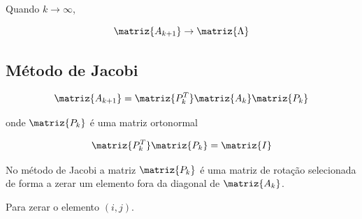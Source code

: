 Quando $ k \rightarrow \infty $,

\begin{equation}
 \label{cap5:sec5:eq6}
 \matriz{A_{k+1}} \rightarrow \matriz{\Lambda}
\end{equation}

\subsection{Método de Jacobi}

\begin{equation}
 \label{cap5:sec5:eq7}
 \matriz{A_{k+1}} = \matriz{P_k^T} \matriz{A_k} \matriz{P_k}
\end{equation}

\noindent
onde $ \matriz{P_k} $ é uma matriz ortonormal

\begin{equation}
 \label{cap5:sec5:eq8}
 \matriz{P_k^T} \matriz{P_k} = \matriz{I}
\end{equation}

No método de Jacobi a matriz $ \matriz{P_k} $ é uma matriz de rotação selecionada de forma a zerar um elemento fora da diagonal de $ \matriz{A_k} $.

Para zerar o elemento $ (i,j) $.

